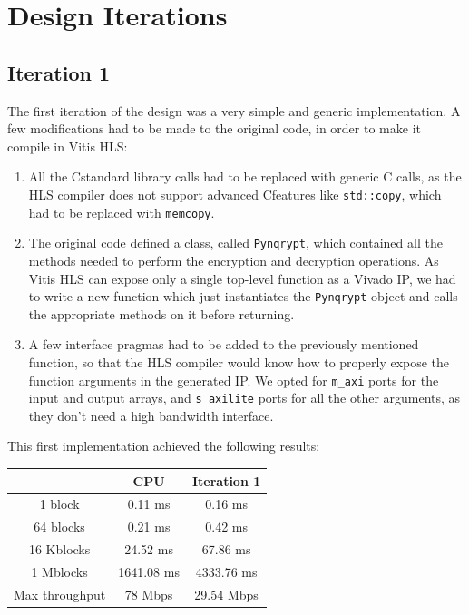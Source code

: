 \documentclass[12pt,oneside,a4paper]{article}
\def\CC{{C\nolinebreak[4]\hspace{-.05em}\raisebox{.4ex}{\tiny\bf ++}}}
\begin{document}
\section{Design Iterations} \label{sec:iterations}

\subsection{Iteration 1} \label{subsec:iter1}
The first iteration of the design was a very simple and generic implementation. A few modifications had to be made to the original code, in order to make it compile in Vitis HLS:
\begin{enumerate}
	\item All the \CC standard library calls had to be replaced with generic C calls, as the HLS compiler does not support advanced \CC features like \texttt{std::copy}, which had to be replaced with \texttt{memcopy}.
	\item The original code defined a class, called \texttt{Pynqrypt}, which contained all the methods needed to perform the encryption and decryption operations. As Vitis HLS can expose only a single top-level function as a Vivado IP, we had to write a new function which just instantiates the \texttt{Pynqrypt} object and calls the appropriate methods on it before returning.
	\item A few interface pragmas had to be added to the previously mentioned function, so that the HLS compiler would know how to properly expose the function arguments in the generated IP. We opted for \texttt{m\_axi} ports for the input and output arrays, and \texttt{s\_axilite} ports for all the other arguments, as they don't need a high bandwidth interface.
\end{enumerate}

This first implementation achieved the following results:
\begin{table}[h!]
	\centering
	\begin{tabular}{ccc}
		\toprule
		 & CPU & Iteration 1 \\
		\midrule
		1 block & 0.11 ms & 0.16 ms \\
		64 blocks & 0.21 ms & 0.42 ms \\
		16 Kblocks & 24.52 ms & 67.86 ms \\
		1 Mblocks & 1641.08 ms & 4333.76 ms \\
		Max throughput & 78 Mbps & 29.54 Mbps \\
		\bottomrule
	\end{tabular}
\end{table}
\end{document}
